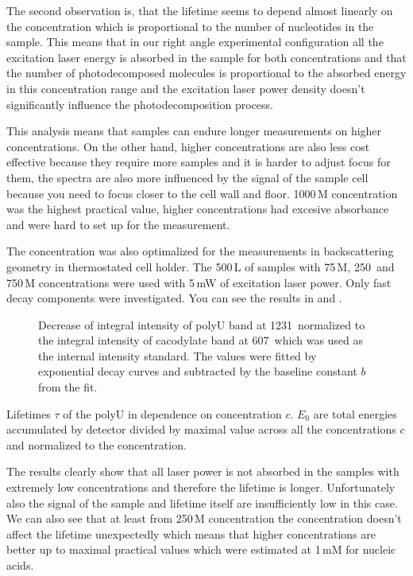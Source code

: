 The second observation is, that the lifetime seems to depend almost linearly on
the concentration which is proportional to the number of nucleotides in the
sample. This means that in our right angle experimental configuration all the
excitation laser energy is absorbed in the sample for both concentrations and
that the number of photodecomposed molecules is proportional to the absorbed
energy in this concentration range and the excitation laser power density
doesn't significantly influence the photodecomposition process.

This analysis means that samples can endure longer measurements on higher
concentrations. On the other hand, higher concentrations are also less cost
effective because they require more samples and it is harder to adjust focus
for them, the spectra are also more influenced by the signal of the sample cell
because you need to focus closer to the cell wall and floor. 1000\,M
concentration was the highest practical value, higher concentrations had
excesive absorbance and were hard to set up for the measurement.

The concentration was also optimalized for the measurements in backscattering
geometry in thermostated cell holder. The 500\,L of samples with
75\,M, 250\, and 750\,M concentrations were used with 5\,mW of
excitation laser power. Only fast decay components were investigated. You can
see the results in
and
.

\begin{figure}
	\centering
	
	\caption{Decrease of integral intensity of polyU band at 1231\,\icm{}
		normalized to the integral intensity of cacodylate band at 607\,\icm{}
		which was used as the internal intensity standard. The values were fitted
		by exponential decay curves  and subtracted
		by the baseline constant $b$ from the fit.}
	\label{\figlabel{conc_optim:hairpins}}
\end{figure}

\begin{table}
	\centering
	
	\caption{Lifetimes $\tau$ of the polyU in dependence on concentration
		$c$. $E_0$ are total energies accumulated by detector divided by maximal
		value across all the concentrations $c$ and normalized to the
		concentration.
	}
	\label{\tablabel{conc_optim:lifetimes_hairpins}}
\end{table}

The results clearly show that all laser power is not absorbed in the samples
with extremely low concentrations and therefore the lifetime is longer.
Unfortunately also the signal of the sample and lifetime itself are
insufficiently low in this case. We can also see that at least from
250\,M concentration the concentration doesn't affect the lifetime
unexpectedly which means that higher concentrations are better up to maximal
practical values which were estimated at 1\,mM for nucleic acids.
